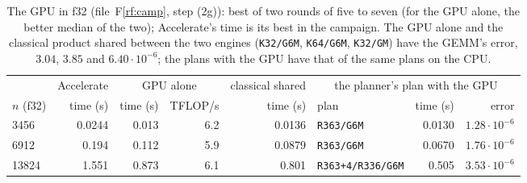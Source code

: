 \documentclass[11pt]{article}
\newcommand{\rf}[1]{F\ref{rf:#1}}
\newcommand{\lv}[1]{\texttt{#1}}
\begin{document}
\begin{table}[t]
\centering\footnotesize
\begin{tabular}{lrrrrlrr}
\toprule
 & Accelerate & \multicolumn{2}{c}{GPU alone} & classical shared & \multicolumn{3}{c}{the planner's plan with the GPU}\\
\cmidrule(lr){3-4}\cmidrule(lr){6-8}
$n$ (f32) & time (s) & time (s) & TFLOP/s & time (s) & plan & time (s) & error\\
\midrule
3456 & 0.0244 & 0.013 & 6.2 & 0.0136 & \lv{R363/G6M} & 0.0130 & $1.28\cdot10^{-6}$\\
6912 & 0.194 & 0.112 & 5.9 & 0.0879 & \lv{R363/G6M} & 0.0670 & $1.76\cdot10^{-6}$\\
13824 & 1.551 & 0.873 & 6.1 & 0.801 & \lv{R363+4/R336/G6M} & 0.505 & $3.53\cdot10^{-6}$\\
\bottomrule
\end{tabular}
\caption{The GPU in f32 (file~\rf{camp},
step (2g)): best of two rounds of five to seven (for the GPU alone, the
better median of the two); Accelerate's time is its
best in the campaign.  The GPU alone and the classical product shared between
the two engines (\lv{K32/G6M}, \lv{K64/G6M}, \lv{K32/GM}) have the GEMM's
error, $3.04$, $3.85$ and $6.40\cdot10^{-6}$; the plans with the GPU have
that of the same plans on the CPU.}
\label{tab:gpu}
\end{table}
\end{document}
